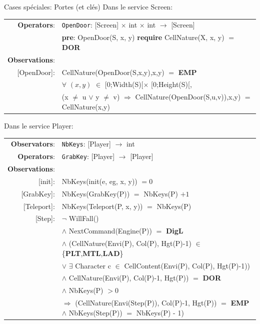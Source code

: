 \documentclass[aspectratio=169]{beamer}
\begin{document}
\begin{frame}{Cases spéciales: Portes (et clés)}
Dans le service \textrm{Screen}:
  \begin{longtable}{rl}
    \textbf{Operators}: & \texttt{OpenDoor}: \textrm{[Screen]} $\times$ \textrm{int} $\times$ \textrm{int}  $\rightarrow$ \textrm{[Screen]} \\
    & \quad\quad \textbf{pre}: \textrm{OpenDoor(S, x, y)} \textbf{require} \textrm{CellNature(X, x, y)} $=$ \textbf{DOR}\\
    \textbf{Observations}:&\\
    \textrm{[OpenDoor]}: & \textrm{CellNature(OpenDoor(S,x,y),x,y)} $=$ \textbf{EMP} \\
    & $\forall$ $(x,y)$ $\in$ \textrm{[0;Width(S)[}$\times$ \textrm{[0;Height(S)[}, \\
    & \quad\quad (\textrm{x} $\neq$ \textrm{u} $\lor$ \textrm{y} $\neq$ \textrm{v}) $\Rightarrow$ \textrm{CellNature(OpenDoor(S,u,v)),x,y)} $=$ \textrm{CellNature(x,y)} \\
  \end{longtable}

Dans le service \textrm{Player}:
  \begin{longtable}{rl}
    \textbf{Observators}:& \texttt{NbKeys}: \textrm{[Player]} $\rightarrow$ \textrm{int}\\
    \textbf{Operators}: & \texttt{GrabKey}: \textrm{[Player]} $\rightarrow$ \textrm{[Player]} \\
    \textbf{Observations}:&\\
    \textrm{[init]}:& \textrm{NbKeys(init(e, eg, x, y))} $= 0$\\
    \textrm{[GrabKey]}:& \textrm{NbKeys(GrabKey(P))} $=$ \textrm{NbKeys(P)} $+ 1$ \\
    \textrm{[Teleport]}:& \textrm{NbKeys(Teleport(P, x, y))} $=$ \textrm{NbKeys(P)}\\
    \textrm{[Step]}:& $\neg$ \textrm{WillFall()}\\
    & \quad\quad $\land$ \textrm{NextCommand(Engine(P))} $=$ \textbf{DigL}\\
    & \quad\quad $\land$ (\textrm{CellNature(Envi(P), Col(P), Hgt(P)-1)} $\in$ \{\textbf{PLT},\textbf{MTL},\textbf{LAD}\}\\
    & \quad\quad\quad\quad $\lor$ $\exists$ \textrm{Character} c $\in$ \textrm{CellContent(Envi(P), Col(P), Hgt(P)-1)})\\
    & \quad\quad $\land$ \textrm{CellNature(Envi(P), Col(P)-1, Hgt(P))} $=$ \textbf{DOR}\\
    & \quad\quad $\land$ \textrm{NbKeys(P)} $> 0$\\
    & \quad\quad $\Rightarrow$ (\textrm{CellNature(Envi(Step(P)), Col(P)-1, Hgt(P))} $=$ \textbf{EMP} $\land$ \textrm{NbKeys(Step(P))} $=$ \textrm{NbKeys(P)} - 1)\\
  \end{longtable}
\end{frame}
\end{document}
